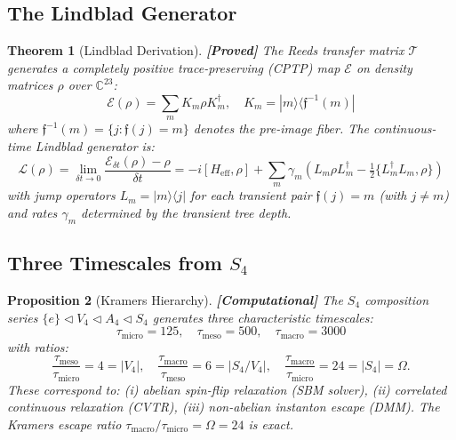 \documentclass[12pt,a4paper]{article}
\newcommand{\proved}[1]{\textcolor{proved}{\textbf{[Proved]}} #1}
\newcommand{\computational}[1]{\textcolor{computational}{\textbf{[Computational]}} #1}
\newtheorem{theorem}{Theorem}[section]
\newtheorem{proposition}[theorem]{Proposition}
\theoremstyle{definition}
\theoremstyle{remark}
\newcommand{\Reeds}{\mathfrak{f}}
\newcommand{\Lindblad}{\mathcal{L}}
\newcommand{\Kraus}{\mathcal{E}}
\begin{document}
\subsection{The Lindblad Generator}

\begin{theorem}[Lindblad Derivation]
\label{thm:lindblad}
\proved{The Reeds transfer matrix $\mathcal{T}$ generates a completely positive
trace-preserving (CPTP) map $\Kraus$ on density matrices $\rho$ over
$\mathbb{C}^{23}$:}
\begin{equation}
  \Kraus(\rho) = \sum_{m} K_m \rho K_m^\dagger, \quad
  K_m = |m\rangle\langle \Reeds^{-1}(m)|
\end{equation}
where $\Reeds^{-1}(m) = \{j : \Reeds(j) = m\}$ denotes the pre-image fiber.
The continuous-time Lindblad generator is:
\begin{equation}
  \Lindblad(\rho) = \lim_{\delta t \to 0} \frac{\Kraus_{\delta t}(\rho) - \rho}{\delta t}
  = -i[H_{\text{eff}}, \rho] + \sum_m \gamma_m \left(L_m \rho L_m^\dagger
    - \tfrac{1}{2}\{L_m^\dagger L_m, \rho\}\right)
\end{equation}
with jump operators $L_m = |m\rangle\langle j|$ for each transient pair
$\Reeds(j) = m$ (with $j \neq m$) and rates $\gamma_m$ determined by the
transient tree depth.
\end{theorem}

\subsection{Three Timescales from $S_4$}

\begin{proposition}[Kramers Hierarchy]
\label{prop:kramers}
\computational{The $S_4$ composition series $\{e\} \triangleleft V_4 \triangleleft A_4 \triangleleft S_4$ generates three characteristic timescales:}
\begin{equation}
  \tau_{\text{micro}} = 125, \quad
  \tau_{\text{meso}} = 500, \quad
  \tau_{\text{macro}} = 3000
\end{equation}
with ratios:
\begin{equation}
  \frac{\tau_{\text{meso}}}{\tau_{\text{micro}}} = 4 = |V_4|, \quad
  \frac{\tau_{\text{macro}}}{\tau_{\text{meso}}} = 6 = |S_4/V_4|, \quad
  \frac{\tau_{\text{macro}}}{\tau_{\text{micro}}} = 24 = |S_4| = \Omega.
\end{equation}
These correspond to: (i) abelian spin-flip relaxation (SBM solver), (ii)
correlated continuous relaxation (CVTR), (iii) non-abelian instanton escape
(DMM). The Kramers escape ratio $\tau_{\text{macro}}/\tau_{\text{micro}} = \Omega = 24$ is exact.
\end{proposition}
\end{document}
